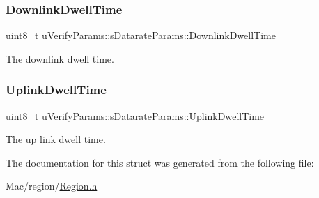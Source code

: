 \subsubsection{\texorpdfstring{Downlink\+Dwell\+Time}{DownlinkDwellTime}}
{\footnotesize\ttfamily uint8\+\_\+t u\+Verify\+Params\+::s\+Datarate\+Params\+::\+Downlink\+Dwell\+Time}

The downlink dwell time. \mbox{\label{structuVerifyParams_1_1sDatarateParams_af6e261fe7a0e3117bd0d37084e294ba6}} 
\subsubsection{\texorpdfstring{Uplink\+Dwell\+Time}{UplinkDwellTime}}
{\footnotesize\ttfamily uint8\+\_\+t u\+Verify\+Params\+::s\+Datarate\+Params\+::\+Uplink\+Dwell\+Time}

The up link dwell time. 

The documentation for this struct was generated from the following file\+:\begin{DoxyCompactItemize}
\item 
Mac/region/\hyperlink{Region_8h}{Region.\+h}\end{DoxyCompactItemize}
